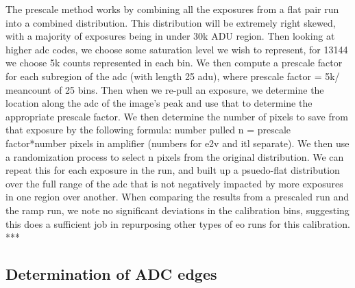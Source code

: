 \documentclass[11pt, letterpaper]{article}
\begin{document}
The prescale method works by combining all the exposures from a flat pair run into a combined distribution. This distribution will be extremely right skewed, with a majority of exposures being in under 30k ADU region. Then looking at higher adc codes, we choose some saturation level we wish to represent, for 13144 we choose 5k counts represented in each bin. We then compute a prescale factor for each subregion of the adc (with length 25 adu), where prescale factor = 5k/ meancount of 25 bins. Then when we re-pull an exposure, we determine the location along the adc of the image's peak and use that to determine the appropriate prescale factor. We then determine the number of pixels to save from that exposure by the following formula: number pulled n = prescale factor*number pixels in amplifier (numbers for e2v and itl separate). We then use a randomization process to select n pixels from the original distribution. We can repeat this for each exposure in the run, and built up a psuedo-flat distribution over the full range of the adc that is not negatively impacted by more exposures in one region over another. When comparing the results from a prescaled run and the ramp run, we note no significant deviations in the calibration bins, suggesting this does a sufficient job in repurposing other types of eo runs for this calibration. 
***

\subsection{Determination of ADC edges}
\end{document}
